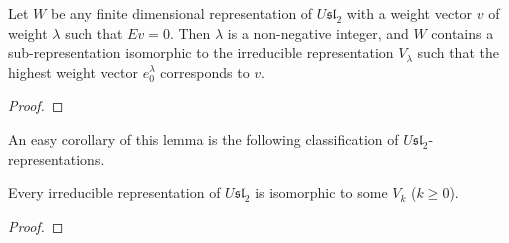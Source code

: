 \begin{lem}
Let $W$ be any finite dimensional representation of $U\mathfrak{sl}_2$ with a weight vector $v$ of weight $\lambda$ such that $Ev=0$. Then $\lambda$ is a non-negative integer, and $W$ contains a sub-representation isomorphic to the irreducible representation $V_\lambda$ such that the highest weight vector $e_0^\lambda$ corresponds to $v$.
\end{lem}
\begin{proof}
\end{proof}

An easy corollary of this lemma is the following classification of $U\mathfrak{sl}_2$-representations.

\begin{cor}
\label{thm Classification of sl2 Representations}
Every irreducible representation of $U\mathfrak{sl}_2$ is isomorphic to some $V_k$ ($k \geq 0$).
\end{cor}
\begin{proof}
\end{proof}



